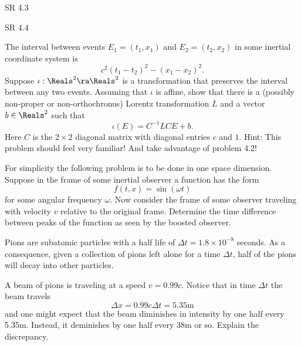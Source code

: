 \documentclass[minion]{homework}
\begin{document}
\begin{aproblems}

\hproblem SR 4.3

\hproblem SR 4.4

\hproblem The interval between events $E_1=(t_1,x_1)$ and $E_2=(t_2,x_2)$ in some inertial coordinate
system is
\begin{equation}
c^2(t_1-t_2)^2 - (x_1-x_2)^2.
\end{equation}
Suppose $\iota:\Reals^2\ra\Reals^2$ is a transformation that preserves the interval between any two
events.  Assuming that $\iota$ is affine, show that there is a (possibly non-proper or non-orthochronus) Lorentz transformation $L$ and a vector $b\in \Reals^2$ such that
\begin{equation}
\iota(E) = C^{-1} L C E + b.
\end{equation}
Here $C$ is the $2\times 2$ diagonal matrix with diagonal entries $c$ and $1$.
Hint: This problem should feel very familiar! And take advantage of problem 4.2!

\hproblem For simplicity the following problem is to be done in one space dimension.
Suppose in the frame of some inertial observer a function has the form
\begin{equation}
f(t,x) = \sin(\omega t)
\end{equation}
for some angular frequency $\omega$.  Now consider the frame of some observer traveling
with velocity $v$ relative to the original frame.  Determine the time difference between peaks
of the function as seen by the boosted observer.

\hproblem Pions are subatomic particles with a half life of $\Delta t=1.8\times10^{-8}$ seconds.  As a consequence, given a collection of pions left alone for a time $\Delta t$, half
of the pions will decay into other particles.

A beam of pions is traveling at a speed $v=0.99c$. Notice that in time $\Delta t$ the beam
travels
\begin{equation}
\Delta x = 0.99 c \Delta t = 5.35 \mathrm{m}
\end{equation}
and one might expect that the beam diminishes in intensity by one half every 5.35m.  Instead,
it deminishes by one half every 38m or so.  Explain the discrepancy.
\end{aproblems}
\end{document}
